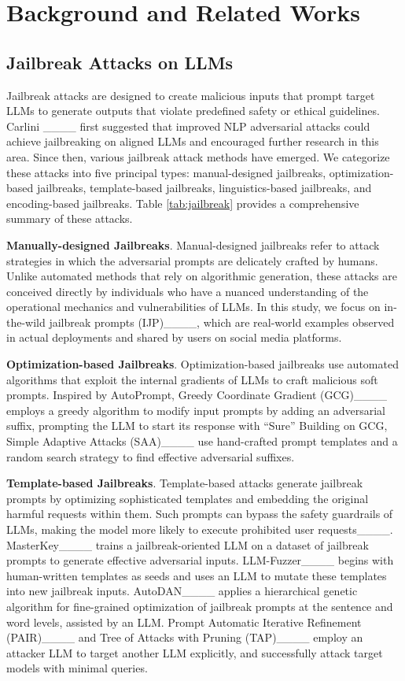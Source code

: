 \section{Background and Related Works}
\subsection{Jailbreak Attacks on LLMs}

Jailbreak attacks are designed to create malicious inputs that prompt target LLMs to generate outputs that violate predefined safety or ethical guidelines. Carlini \etal____ first suggested that improved NLP adversarial attacks could achieve jailbreaking on aligned LLMs and encouraged further research in this area. Since then, various jailbreak attack methods have emerged. We categorize these attacks into five principal types: manual-designed jailbreaks, optimization-based jailbreaks, template-based jailbreaks, linguistics-based jailbreaks, and encoding-based jailbreaks. Table \ref{tab:jailbreak} provides a comprehensive summary of these attacks.

\noindent\textbf{Manually-designed Jailbreaks}. Manual-designed jailbreaks refer to attack strategies in which the adversarial prompts are delicately crafted by humans. Unlike automated methods that rely on algorithmic generation, these attacks are conceived directly by individuals who have a nuanced understanding of the operational mechanics and vulnerabilities of LLMs.
In this study, we focus on in-the-wild jailbreak prompts (IJP)____, which are real-world examples observed in actual deployments and shared by users on social media platforms.

\noindent\textbf{Optimization-based Jailbreaks}. 
Optimization-based jailbreaks use automated algorithms that exploit the internal gradients of LLMs to craft malicious soft prompts. Inspired by AutoPrompt, Greedy Coordinate Gradient (GCG)____ employs a greedy algorithm to modify input prompts by adding an adversarial suffix, prompting the LLM to start its response with ``Sure'' Building on GCG, Simple Adaptive Attacks (SAA)____ use hand-crafted prompt templates and a random search strategy to find effective adversarial suffixes.

\noindent\textbf{Template-based Jailbreaks}. 
Template-based attacks generate jailbreak prompts by optimizing sophisticated templates and embedding the original harmful requests within them. Such prompts can bypass the safety guardrails of LLMs, making the model more likely to execute prohibited user requests____.
MasterKey____ trains a jailbreak-oriented LLM on a dataset of jailbreak prompts to generate effective adversarial inputs. LLM-Fuzzer____ begins with human-written templates as seeds and uses an LLM to mutate these templates into new jailbreak inputs. AutoDAN____ applies a hierarchical genetic algorithm for fine-grained optimization of jailbreak prompts at the sentence and word levels, assisted by an LLM. Prompt Automatic Iterative Refinement (PAIR)____ and Tree of Attacks with Pruning (TAP)____ employ an attacker LLM to target another LLM explicitly, and successfully attack target models with minimal queries.


